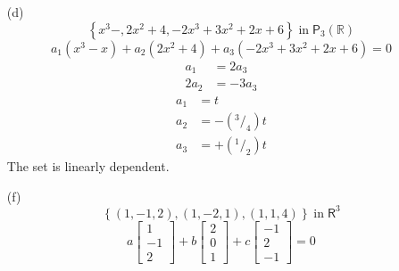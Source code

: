 \begin{enumerate}
\item[(d)]
\[
\left\{x^3 - , 2x^2 + 4, -2x^3 + 3x^2 + 2x +6\right\} \;\text{in}\;  \mathsf{P}_3\left(\mathbb{R}\right)
\]
\begin{equation}
a_1\left(x^3-x\right) +a_2\left(2x^2 + 4\right) + a_3\left(-2x^3
  +3x^2+2x+6\right) = 0
\end{equation}
\begin{align}
a_1 &= 2a_3\\
2a_2 &= -3a_3
\end{align}
\begin{align}
a_1 &= t\\
a_2 &= -\left(^3/_4\right)t\\
a_3 &= +\left(^1/_2\right)t
\end{align}
The set is linearly dependent.
\newpage{}
\item[(f)]
\[
\left\{\left(1,-1,2\right),\left(1,-2,1\right),\left(1,1,4\right)\right\}
\;\text{in}\; \mathsf{R}^3
\]
\begin{equation}
a\begin{bmatrix}
1\\
-1\\
2
\end{bmatrix}
+ b\begin{bmatrix}
2\\
0\\
1
\end{bmatrix}
+ c\begin{bmatrix}
-1\\
2\\
-1
\end{bmatrix}
=0
\end{equation}


\end{enumerate}

